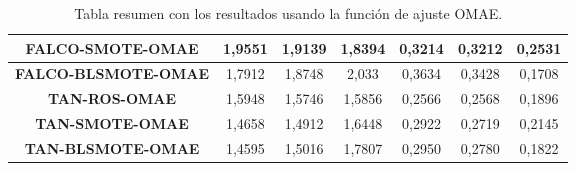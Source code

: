 \begin{table}[H]
{\begin{tabular}{|ccccccc|}
\multicolumn{1}{|c|}{\textbf{FALCO-SMOTE-OMAE}}   & \multicolumn{1}{c|}{1,9551}           & \multicolumn{1}{c|}{1,9139}             & \multicolumn{1}{c|}{1,8394}       & \multicolumn{1}{c|}{0,3214}            & \multicolumn{1}{c|}{0,3212}             & 0,2531       \\ \hline
\multicolumn{1}{|c|}{\textbf{FALCO-BLSMOTE-OMAE}} & \multicolumn{1}{c|}{1,7912}           & \multicolumn{1}{c|}{1,8748}             & \multicolumn{1}{c|}{2,033}         & \multicolumn{1}{c|}{0,3634}           & \multicolumn{1}{c|}{0,3428}              & 0,1708       \\ \hline
\multicolumn{1}{|c|}{\textbf{TAN-ROS-OMAE}}       & \multicolumn{1}{c|}{1,5948}           & \multicolumn{1}{c|}{1,5746}             & \multicolumn{1}{c|}{1,5856}       & \multicolumn{1}{c|}{0,2566}           & \multicolumn{1}{c|}{0,2568}             & 0,1896        \\ \hline
\multicolumn{1}{|c|}{\textbf{TAN-SMOTE-OMAE}}     & \multicolumn{1}{c|}{1,4658}           & \multicolumn{1}{c|}{1,4912}             & \multicolumn{1}{c|}{1,6448}       & \multicolumn{1}{c|}{0,2922}           & \multicolumn{1}{c|}{0,2719}             & 0,2145       \\ \hline
\multicolumn{1}{|c|}{\textbf{TAN-BLSMOTE-OMAE}}   & \multicolumn{1}{c|}{1,4595}           & \multicolumn{1}{c|}{1,5016}             & \multicolumn{1}{c|}{1,7807}       & \multicolumn{1}{c|}{0,2950}           & \multicolumn{1}{c|}{0,2780}             & 0,1822       \\ \hline
\end{tabular}%
}
\caption{Tabla resumen con los resultados usando la función de ajuste OMAE.}\label{resumenOMAE}
\end{table}


